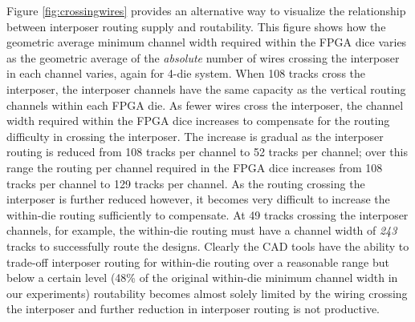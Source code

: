 \documentclass{sig-alternate-2013}
\begin{document}


Figure \ref{fig:crossingwires} provides an alternative way to visualize the relationship between interposer routing supply and routability. This figure shows how the geometric average minimum channel width required within the FPGA dice varies as the geometric average of the \emph{absolute} number of wires crossing the interposer in each channel varies, again for 4-die system. When 108 tracks cross the interposer, the interposer channels have the same capacity as the vertical routing channels within each FPGA die. As fewer wires cross the interposer, the channel width required within the FPGA dice increases to compensate for the routing difficulty in crossing the interposer. The increase is gradual as the interposer routing is reduced from 108 tracks per channel to 52 tracks per channel; over this range the routing per channel required in the FPGA dice increases from 108 tracks per channel to 129 tracks per channel. As the routing crossing the interposer is further reduced however, it becomes very difficult to increase the within-die routing sufficiently to compensate. At 49 tracks crossing the interposer channels, for example, the within-die routing must have a channel width of \emph{243} tracks to successfully route the designs. Clearly the CAD tools have the ability to trade-off interposer routing for within-die routing over a reasonable range but below a certain level (48\% of the original within-die minimum channel width in our experiments) routability becomes almost solely limited by the wiring crossing the interposer and further reduction in interposer routing is not productive.
\end{document}
